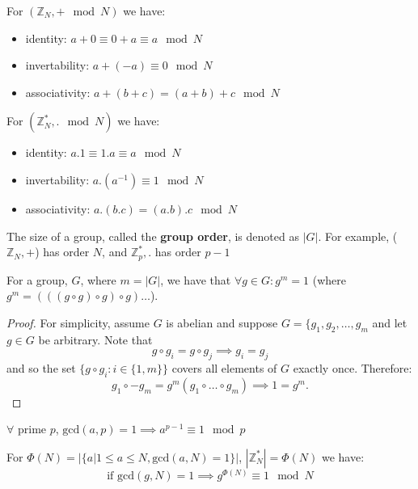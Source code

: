 \begin{eg}
	For \((\mathbb{Z}_N, + \mod N)\) we have:
	\begin{itemize}
		\item identity: \(a + 0 \equiv 0 + a \equiv a \mod N \)
		\item invertability: \(a + (-a) \equiv 0 \mod N\)
		\item associativity: \(a + (b + c) = (a + b) + c \mod N\)  
	\end{itemize}
\end{eg}

\begin{eg}
	For \((\mathbb{Z}_N^*, . \mod N)\) we have:
	\begin{itemize}
		\item identity: \(a . 1 \equiv 1 . a \equiv a \mod N \)
		\item invertability: \(a . (a^{-1}) \equiv 1 \mod N\)
		\item associativity: \(a . (b . c) = (a . b) . c \mod N\)  
	\end{itemize}
\end{eg}

The size of a group, called the \textbf{group order}, is denoted as
\(|G|\). For example, (\(\mathbb{Z}_N, +\)) has order \(N\), and
\(\mathbb{Z}_p^*, .\) has order \(p - 1\)

\begin{theorem}
	For a group, \(G\), where \(m = |G|\), we have that \(\forall g \in G \colon
	g^m = 1\) (where \(g^m = (((g \circ g) \circ g) \circ g) \ldots \)).   
\end{theorem}

\begin{proof}
	For simplicity, assume \(G\) is abelian and suppose \(G = \{g_1, g_2, \ldots, g_m\) and
	let \(g \in G\) be arbitrary. Note that
	\[
		g \circ g_i = g \circ g_j \implies g_i = g_j
	\]
	and so the set \(\{g \circ g_i : i \in \{1, m\}\}\) covers all elements of
	\(G\) exactly once. Therefore:
	\[
		g_1 \circ -g_m = g^m (g_1 \circ \ldots \circ g_m) \implies 1 = g^m.
	\]   
\end{proof}

\begin{corollary}\label{flt}
	\(\forall\) prime \(p\), \(\text{gcd}(a, p) = 1 \implies a^{p - 1} \equiv 1 \mod p\)   
\end{corollary}

\begin{theorem}\label{EulerThm}
	For \(\Phi(N) = \big | \{ a | 1 \leq a \leq N, \text{gcd}(a, N) = 1 \} \big |\),
	\(| \mathbb{Z}_N^* | = \Phi(N)\) we have:
	\[
		\text{if gcd}(g, N) = 1 \implies g^{\Phi(N)} \equiv 1 \mod N
	\]  
\end{theorem}

